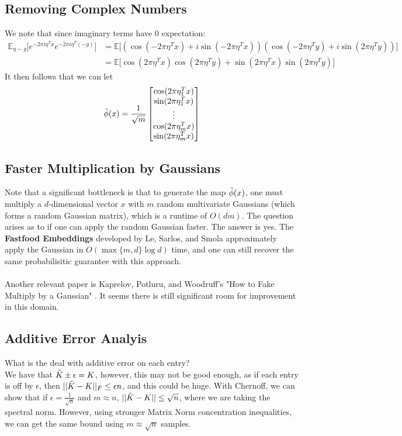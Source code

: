 \documentclass[11pt]{article}
\begin{document}
\subsection{Removing Complex Numbers}
We note that since imaginary terms have 0 expectation:
\begin{align*}
    \mathbb{E}_{\eta \sim g} \Big[ e^{-2 \pi i \eta^T x} e^{-2 \pi i \eta^T (-y)} \Big] &= \mathbb{E} \Big[ (\cos( -2 \pi \eta^T x) + i \sin(-2 \pi \eta^T x)) (\cos(-2 \pi \eta^T y) + i \sin(2 \pi \eta^T y)) \Big]\\
    &= \mathbb{E} \Big[ \cos( 2 \pi \eta^T x)\cos( 2 \pi \eta^T y) + \sin(2 \pi \eta^T x)\sin(2 \pi \eta^T y) \Big]
\end{align*}
It then follows that we can let
\[
\Tilde{\phi}(x) = \frac{1}{\sqrt{m}} \begin{bmatrix}
\cos( 2 \pi \eta_1^T x) \\ \sin( 2 \pi \eta_1^T x) \\ \vdots \\\cos( 2 \pi \eta_m^T x) \\ \sin( 2 \pi \eta_m^T x) 
\end{bmatrix}
\]

\subsection{Faster Multiplication by Gaussians}

Note that a significant bottleneck is that to generate the map $\Tilde{\phi}(x)$, one must multiply a $d$-dimensional vector $x$ with $m$ random multivariate Gaussians (which forms a random Gaussian matrix), which is a runtime of $O(dm)$. The question arises as to if one can apply the random Gaussian faster. The answer is yes.
The \textbf{Fastfood Embeddings} developed by Le, Sarlos, and Smola \cite{Fastfood} approximately apply the Gaussian in $O(\max \{m,d\} \log d)$ time, and one can still recover the same probabilisitic guarantee with this approach. 
\\\\
Another relevant paper is Kaprelov, Potluru, and Woodruff's "How to Fake Multiply by a Gaussian" \cite{WoodruffGauss}. It seems there is still significant room for improvement in this domain. 

\subsection{Additive Error Analyis}
What is the deal with additive error on each entry?
\\
We have that $\Tilde{K} \pm \epsilon = K$, however, this may not be good enough, as if each entry is off by $\epsilon$, then $||\Tilde{K}-K||_F \leq \epsilon n$, and this could be huge. With Chernoff, we can show that if $\epsilon = \frac{1}{\sqrt{n}}$ and $m \approx n$, $||\Tilde{K}-K|| \leq \sqrt{n}$, where we are taking the spectral norm. However, using stronger Matrix Norm concentration inequalities, we can get the same bound using $m \approx \sqrt{n}$ samples. 
\end{document}
